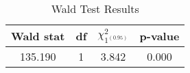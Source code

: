 \begin{table}[H]
\centering
\caption{Wald Test Results}
\label{tab:wald}
\begin{tabular}{cccc}
\toprule
Wald stat & df & $\chi^2_{1^{(0.95)}}$ & p-value \\
\midrule
135.190 & 1 & 3.842 & 0.000 \\
\bottomrule
\end{tabular}
\end{table}
